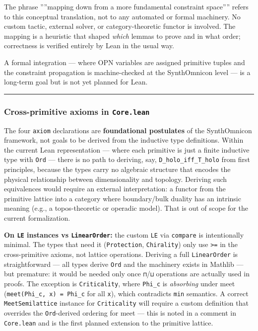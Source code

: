 \documentclass[10pt,a4paper]{article}
\begin{document}
The phrase ''''mapping down from a more fundamental constraint space'''' refers to this conceptual
translation, not to any automated or formal machinery. No custom tactic, external solver, or
category-theoretic functor is involved. The mapping is a heuristic that shaped \emph{which} lemmas
to prove and in what order; correctness is verified entirely by Lean in the usual way.

A formal integration --- where OPN variables are assigned primitive tuples and the constraint
propagation is machine-checked at the SynthOmnicon level --- is a long-term goal but is not yet
planned for Lean.

\begin{center}
\rule{0.5\textwidth}{0.4pt}
\end{center}

\subsubsection{Cross-primitive axioms in \texttt{Core.lean}}

The four \texttt{axiom} declarations are \textbf{foundational postulates} of the SynthOmnicon framework,
not goals to be derived from the inductive type definitions. Within the current Lean
representation --- where each primitive is just a finite inductive type with \texttt{Ord} --- there is
no path to deriving, say, \texttt{D\_holo\_iff\_T\_holo} from first principles, because the types carry
no algebraic structure that encodes the physical relationship between dimensionality and topology.
Deriving such equivalences would require an external interpretation: a functor from the primitive
lattice into a category where boundary/bulk duality has an intrinsic meaning (e.g., a
topos-theoretic or operadic model). That is out of scope for the current formalization.

\textbf{On \texttt{LE} instances vs \texttt{LinearOrder}:} the custom \texttt{LE} via \texttt{compare} is intentionally minimal.
The types that need it (\texttt{Protection}, \texttt{Chirality}) only use \texttt{\textgreater{}=} in the cross-primitive axioms,
not lattice operations. Deriving a full \texttt{LinearOrder} is straightforward --- all types derive \texttt{Ord}
and the machinery exists in Mathlib --- but premature: it would be needed only once \texttt{⊓}/\texttt{⊔}
operations are actually used in proofs. The exception is \texttt{Criticality}, where \texttt{Phi\_c} is
\emph{absorbing} under meet (\texttt{meet(Phi\_c, x) = Phi\_c} for all \texttt{x}), which contradicts \texttt{min} semantics.
A correct \texttt{MeetSemilattice} instance for \texttt{Criticality} will require a custom definition that
overrides the \texttt{Ord}-derived ordering for meet --- this is noted in a comment in \texttt{Core.lean} and
is the first planned extension to the primitive lattice.
\end{document}
